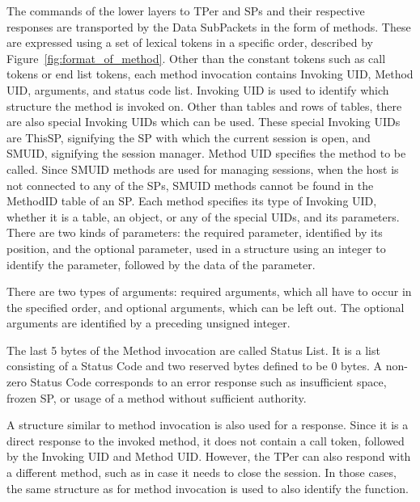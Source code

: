 The commands of the lower layers to TPer and SPs and their respective responses are transported by the Data SubPackets in the form of methods. 
These are expressed using a set of lexical tokens in a specific order, described by Figure~\ref{fig:format_of_method}.
Other than the constant tokens such as call tokens or end list tokens, each method invocation contains Invoking UID, Method UID, arguments, and status code list.
Invoking UID is used to identify which structure the method is invoked on. Other than tables and rows of tables, there are also special Invoking UIDs which can be used. These special Invoking UIDs are ThisSP, signifying the SP with which the current session is open, and SMUID, signifying the session manager.
Method UID specifies the method to be called. 
Since SMUID methods are used for managing sessions, when the host is not connected to any of the SPs, SMUID methods cannot be found in the MethodID table of an SP.
Each method specifies its type of Invoking UID, whether it is a table, an object, or any of the special UIDs, and its parameters. There are two kinds of parameters: the required parameter, identified by its position, and the optional parameter, used in a structure using an integer to identify the parameter, followed by the data of the parameter.

There are two types of arguments: required arguments, which all have to occur in the specified order, and optional arguments, which can be left out. The optional arguments are identified by a preceding unsigned integer.

The last 5 bytes of the Method invocation are called Status List. It is a list consisting of a Status Code and two reserved bytes defined to be 0 bytes. A non-zero Status Code corresponds to an error response such as insufficient space, frozen SP, or usage of a method without sufficient authority.

A structure similar to method invocation is also used for a response. Since it is a direct response to the invoked method, it does not contain a call token, followed by the Invoking UID and Method UID.
However, the TPer can also respond with a different method, such as in case it needs to close the session. In those cases, the same structure as for method invocation is used to also identify the function.


